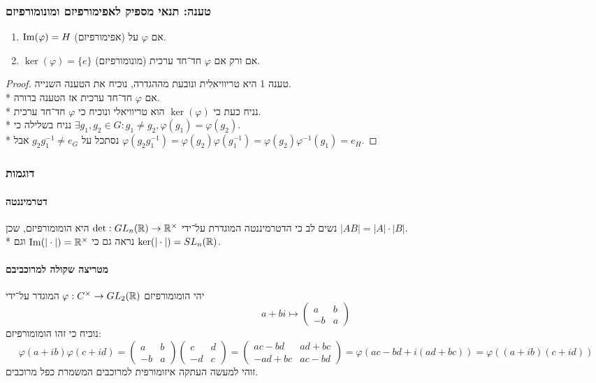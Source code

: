 \subsubsection{טענה: תנאי מספיק לאפימורפיזם ומונומורפיזם}
\begin{enumerate}
	\item $\operatorname{Im}(\varphi) = H$ אם $\varphi$ על (אפימורפיזם).
	\item $\ker(\varphi) = \{e\}$ אם ורק אם $\varphi$ חד־חד ערכית (מונומורפיזם).
\end{enumerate}
\begin{proof}
	טענה 1 היא טריוויאלית ונובעת מההגדרה, נוכיח את הטענה השנייה. \\*
	אם $\varphi$ חד־חד ערכית אז הטענה ברורה. \\*
	נניח כעת כי $\ker(\varphi)$ הוא טריוויאלי ונוכיח כי $\varphi$ חד־חד ערכית. \\*
	נניח בשלילה כי $\exists g_1, g_2 \in G : g_1 \ne g_2, \varphi(g_1) = \varphi(g_2)$. \\*
	נסתכל על $g_2 g_1^{-1} \ne e_G$
	אבל $\varphi(g_2g_1^{-1}) = \varphi(g_2) \varphi(g_1^{-1}) = \varphi(g_2)\varphi^{-1}(g_1) = e_H$.
\end{proof}

\subsubsection{דוגמות}
\paragraph{דטרמיננטה}
נשים לב כי הדטרמיננטה המוגדרת על־ידי $\det : GL_n(\mathbb{R}) \to \mathbb{R}^\times$ היא הומומורפיזם, שכן $|AB| = |A| \cdot |B|$. \\*
נראה גם כי $\operatorname{Im}(|\cdot|) = \mathbb{R}^\times$ וגם $\ker(| \cdot|) = SL_n(\mathbb{R})$.

\paragraph{מטריצה שקולה למרוכביבם}
יהי הומומורפיזם $\varphi : C^\times \to GL_2(\mathbb{R})$ המוגדר על־ידי 
\[
	a + bi \mapsto
	\begin{pmatrix}
		a & b \\
		-b & a
	\end{pmatrix}
\]
נוכיח כי זהו הומומורפיזם:
\[
	\varphi(a + ib)\varphi(c + id) = 
	\begin{pmatrix}
		a & b \\
		-b & a
	\end{pmatrix}
	\begin{pmatrix}
		c & d \\
		-d & c
	\end{pmatrix}
	=
	\begin{pmatrix}
		ac - bd & ad + bc \\
		-ad + bc & ac - bd
	\end{pmatrix}
	= \varphi(ac - bd + i(ad + bc))
	= \varphi((a + ib)(c + id))
\]
זוהי למעשה העתקה איזומורפית למרוכבים המשמרת כפל מרוכבים.

